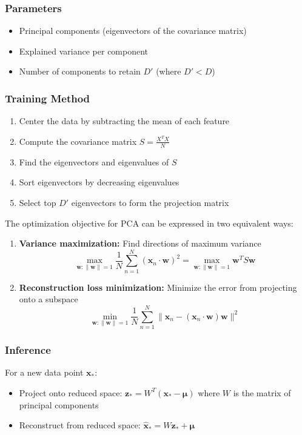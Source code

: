 \documentclass{article}
\begin{document}
\subsubsection{Parameters}
\begin{itemize}
    \item Principal components (eigenvectors of the covariance matrix)
    \item Explained variance per component
    \item Number of components to retain $D'$ (where $D' < D$)
\end{itemize}

\subsubsection{Training Method}
\begin{enumerate}
    \item Center the data by subtracting the mean of each feature
    \item Compute the covariance matrix $S = \frac{X^TX}{N}$
    \item Find the eigenvectors and eigenvalues of $S$
    \item Sort eigenvectors by decreasing eigenvalues
    \item Select top $D'$ eigenvectors to form the projection matrix
\end{enumerate}

The optimization objective for PCA can be expressed in two equivalent ways:
\begin{enumerate}
    \item \textbf{Variance maximization:} Find directions of maximum variance
    \begin{equation}
        \max_{\mathbf{w}: \|\mathbf{w}\|=1} \frac{1}{N}\sum_{n=1}^N (\mathbf{x}_n \cdot \mathbf{w})^2 = \max_{\mathbf{w}: \|\mathbf{w}\|=1} \mathbf{w}^T S \mathbf{w}
    \end{equation}
    
    \item \textbf{Reconstruction loss minimization:} Minimize the error from projecting onto a subspace
    \begin{equation}
        \min_{\mathbf{w}: \|\mathbf{w}\|=1} \frac{1}{N}\sum_{n=1}^N \|\mathbf{x}_n - (\mathbf{x}_n \cdot \mathbf{w})\mathbf{w}\|^2
    \end{equation}
\end{enumerate}

\subsubsection{Inference}
For a new data point $\mathbf{x}_*$:
\begin{itemize}
    \item Project onto reduced space: $\mathbf{z}_* = W^T(\mathbf{x}_* - \boldsymbol{\mu})$ where $W$ is the matrix of principal components
    \item Reconstruct from reduced space: $\hat{\mathbf{x}}_* = W\mathbf{z}_* + \boldsymbol{\mu}$
\end{itemize}
\end{document}

